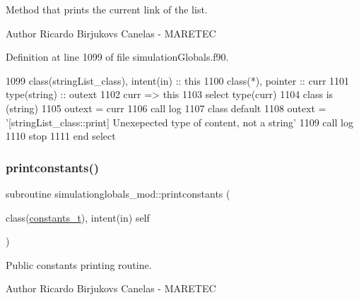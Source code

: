 Method that prints the current link of the list. 

\begin{DoxyAuthor}{Author}
Ricardo Birjukovs Canelas -\/ M\+A\+R\+E\+T\+EC 
\end{DoxyAuthor}


Definition at line 1099 of file simulation\+Globals.\+f90.


\begin{DoxyCode}
1099     \textcolor{keywordtype}{class}(stringList\_class), \textcolor{keywordtype}{intent(in)} :: this
1100     \textcolor{keywordtype}{class}(*), \textcolor{keywordtype}{pointer} :: curr
1101     \textcolor{keywordtype}{type}(string) :: outext
1102     curr => this%
1103     \textcolor{keywordflow}{select type}(curr)
1104 \textcolor{keywordflow}{    class is} (string)
1105         outext = curr
1106         \textcolor{keyword}{call }log%
1107 \textcolor{keywordflow}{        class default}
1108         outext = \textcolor{stringliteral}{'[stringList\_class::print] Unexepected type of content, not a string'}
1109         \textcolor{keyword}{call }log%
1110         stop
1111 \textcolor{keywordflow}{    end select}
\end{DoxyCode}
\mbox{\label{namespacesimulationglobals__mod_a139cb36f8366e6aec875c7977235fd68}} 
\subsubsection{\texorpdfstring{printconstants()}{printconstants()}}
{\footnotesize\ttfamily subroutine simulationglobals\+\_\+mod\+::printconstants (\begin{DoxyParamCaption}\item[{class(\mbox{\hyperlink{structsimulationglobals__mod_1_1constants__t}{constants\+\_\+t}}), intent(in)}]{self }\end{DoxyParamCaption})\hspace{0.3cm}{\ttfamily [private]}}



Public constants printing routine. 

\begin{DoxyAuthor}{Author}
Ricardo Birjukovs Canelas -\/ M\+A\+R\+E\+T\+EC 
\end{DoxyAuthor}


